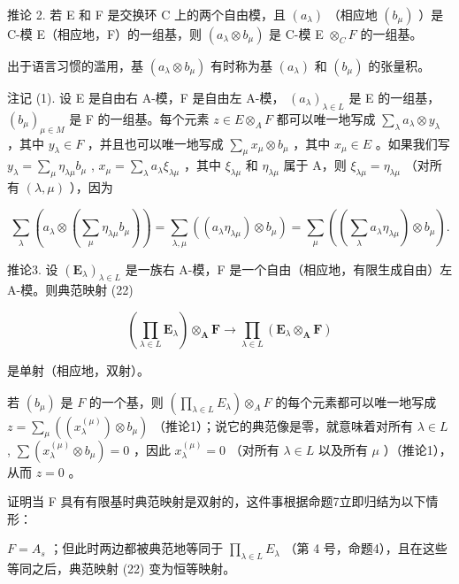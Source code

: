推论 2. 若 E 和 F 是交换环 C 上的两个自由模，且 \((a_{\lambda})\) （相应地 \((b_{\mu})\) ）是 C-模 E（相应地，F）的一组基，则 \((a_{\lambda} \otimes b_{\mu})\) 是 C-模 E \(\otimes_{C} F\) 的一组基。

出于语言习惯的滥用，基 \((a_{\lambda} \otimes b_{\mu})\) 有时称为基 \((a_{\lambda})\) 和 \((b_{\mu})\) 的张量积。

注记 (1). 设 E 是自由右 A-模，F 是自由左 A-模， \((a_{\lambda})_{\lambda \in L}\) 是 E 的一组基， \((b_{\mu})_{\mu \in M}\) 是 F 的一组基。每个元素 \(z \in E \otimes_{A} F\) 都可以唯一地写成 \(\sum_{\lambda} a_{\lambda} \otimes y_{\lambda}\) ，其中 \(y_{\lambda} \in F\) ，并且也可以唯一地写成 \(\sum_{\mu} x_{\mu} \otimes b_{\mu}\) ，其中 \(x_{\mu} \in E\) 。如果我们写 \(y_{\lambda} = \sum_{\mu} \eta_{\lambda \mu} b_{\mu}\) , \(x_{\mu} = \sum_{\lambda} a_{\lambda} \xi_{\lambda \mu}\) ，其中 \(\xi_{\lambda \mu}\) 和 \(\eta_{\lambda \mu}\) 属于 A，则 \(\xi_{\lambda \mu} = \eta_{\lambda \mu}\) （对所有 \((\lambda, \mu)\) ），因为

\[
\sum_ {\lambda} \left(a _ {\lambda} \otimes \left(\sum_ {\mu} \eta_ {\lambda \mu} b _ {\mu}\right)\right) = \sum_ {\lambda , \mu} \left((a _ {\lambda} \eta_ {\lambda \mu}) \otimes b _ {\mu}\right) = \sum_ {\mu} \left(\left(\sum_ {\lambda} a _ {\lambda} \eta_ {\lambda \mu}\right) \otimes b _ {\mu}\right).
\]

推论3. 设 \((\mathbf{E}_{\lambda})_{\lambda \in L}\) 是一族右 A-模，F 是一个自由（相应地，有限生成自由）左 A-模。则典范映射 (22)

\[
\left(\prod_ {\lambda \in L} \mathbf {E} _ {\lambda}\right) \otimes_ {\mathbf {A}} \mathbf {F} \rightarrow \prod_ {\lambda \in L} \left(\mathbf {E} _ {\lambda} \otimes_ {\mathbf {A}} \mathbf {F}\right)
\]

是单射（相应地，双射）。

若 \((b_{\mu})\) 是 \(F\) 的一个基，则 \(\left(\prod_{\lambda \in L} E_{\lambda}\right) \otimes_{A} F\) 的每个元素都可以唯一地写成 \(z = \sum_{\mu} ((x_{\lambda}^{(\mu)}) \otimes b_{\mu})\) （推论1）；说它的典范像是零，就意味着对所有 \(\lambda \in L\) , \(\sum (x_{\lambda}^{(\mu)} \otimes b_{\mu}) = 0\) ，因此 \(x_{\lambda}^{(\mu)} = 0\) （对所有 \(\lambda \in L\) 以及所有 \(\mu\) ）（推论1），从而 \(z = 0\) 。

证明当 F 具有有限基时典范映射是双射的，这件事根据命题7立即归结为以下情形：

\(F = A_{s}\) ；但此时两边都被典范地等同于 \(\prod_{\lambda \in L} E_{\lambda}\) （第 4 号，命题4），且在这些等同之后，典范映射 (22) 变为恒等映射。

